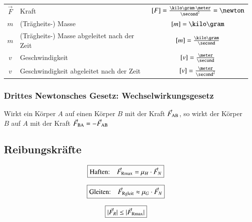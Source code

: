 \vspace{0.2cm}

\begin{minipage}{0.5\columnwidth}
	\begin{tabular}{c l c}
		$\vec{F}$ & Kraft                                       & $[F] = \frac{\kilo \gram \cdot \meter}{\second^2}  = \newton$ \\
		   $m$    & (Trägheits-) Masse                          & $[m] = \kilo \gram$                                           \\
		   $m$    & (Trägheits-) Masse abgeleitet nach der Zeit & $[m] = \frac{\kilo \gram}{\second}$                           \\
		   $v$    & Geschwindigkeit                             & $[v] = \frac{\meter}{\second}$                                \\
		   $v$    & Geschwindigkeit  abgeleitet nach der Zeit    & $[v] = \frac{\meter}{\second^2}$
	\end{tabular}
\end{minipage}


\subsubsection{Drittes Newtonsches Gesetz: Wechselwirkungsgesetz}

Wirkt ein Körper $A$ auf einen Körper $B$ mit der Kraft $\vec{F}_{\rm AB}$, so wirkt der Körper $B$ auf $A$ mit der
Kraft $\vec{F}_{\rm BA} = - \vec{F}_{\rm AB}$


\subsection{Reibungskräfte}

\begin{minipage}{0.37\columnwidth}
	$$ \boxed{ \text{Haften:} \quad \vec{F}_{\rm Rmax} = \mu_H \cdot \vec{F}_N } $$ 
\end{minipage}
\hfill
\begin{minipage}{0.37\columnwidth}
	$$ \boxed{ \text{Gleiten:} \quad \vec{F}_{\rm Rgleit} \approx \mu_G \cdot \vec{F}_N } $$ 
\end{minipage}
\hfill
\begin{minipage}{0.2\columnwidth}
	$$ \boxed{ \vert \vec{F}_R \vert \leq \vert \vec{F}_{\rm Rmax} \vert } $$
\end{minipage}

\vspace{0.2cm}

